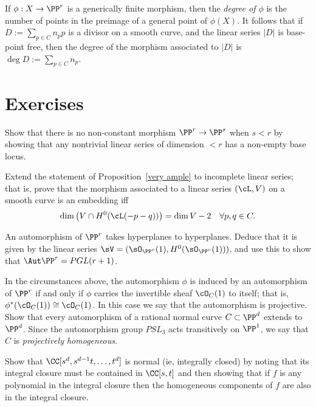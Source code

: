 If $\phi:X \to \PP^r$ is a generically finite morphism, then the \emph{degree of $\phi$} is the number of points in the preimage of a general point of $\phi(X)$. It follows that if $D := \sum_{p\in C} n_pp$ is a divisor on a smooth curve, and the linear series $|D|$ is base-point free, then the degree of the morphism associated to $|D|$ is $\deg D := \sum_{p\in C} n_p$.

\section{Exercises}

\begin{exercise}\label{here there be basepoints}
 Show that there is no non-constant morphism $\PP^r\to \PP^s$ when $s<r$ by showing that any nontrivial linear
 series of dimension $<r$ has a non-empty base locus.
\end{exercise}

\begin{exercise}
Extend the statement of Proposition~\ref{very ample} to incomplete linear series; that is, prove that the morphism associated to a linear series $(\cL, V)$
on a smooth curve is an embedding iff
$$
\dim\big( V \cap H^0(\cL(-p-q))\big) = \dim V - 2 \quad \forall p, q \in C.
$$
\end{exercise}

\begin{exercise}\label{aut Pr}
An automorphism of $\PP^r$ takes hyperplanes to hyperplanes. Deduce that it is given by the linear series
$\sV = (\sO_{\PP^r}(1), H^0(\sO_{\PP^r}(1)))$, and use this to show that $\Aut \PP^r = PGL(r+1)$. 
\end{exercise}

\begin{exercise}\label{projective automorphism}
In the circumstances above, the automorphism $\phi$ is induced by an automorphism of $\PP^r$ if and only if $\phi$ carries the invertible sheaf $\cO_{C}(1)$ to itself; that is, $\phi^*(\cO_{C}(1)) \cong \cO_{C}(1)$. In this case we say that the automorphism
is projective. Show that every automorphism of a rational normal curve $C \subset \PP^d$  extends to $\PP^d$. Since the
automorphism group $PSL_3$ acts transitively on $\PP^1$, we say that
$C$ is \emph{projectively homogeneous}.


\end{exercise}

\begin{exercise}\label{normality of RNC}
 Show that $\CC[s^d,s^{d-1}t,\dots, t^d]$ is normal (ie, integrally closed) by noting that its integral closure must be
 contained in $\CC[s,t]$ and then showing that if $f$ is any polynomial
 in the integral closure then the homogeneous components of $f$ are also in the integral closure.
\end{exercise}




